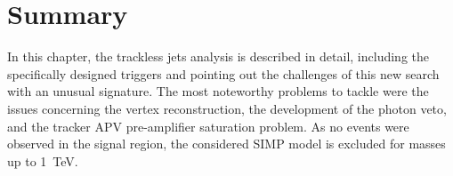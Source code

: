 \section{Summary}

In this chapter, the trackless jets analysis is described in detail, including the specifically designed triggers and pointing out the challenges of this new search with an unusual signature. The most noteworthy problems to tackle were the issues concerning the vertex reconstruction, the development of the photon veto, and the tracker APV pre-amplifier saturation problem. As no events were observed in the signal region, the considered \ac{SIMP} model is excluded for masses up to \SI{1}{TeV}.

\clearpage


\clearpage{\pagestyle{empty}\cleardoublepage}
